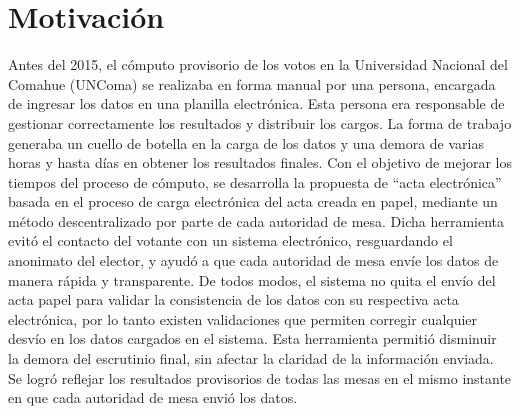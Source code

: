 \section{Motivación}
Antes del 2015, el cómputo provisorio de los votos en la Universidad Nacional del Comahue (UNComa) se realizaba en forma manual por una persona, encargada de ingresar los datos en una planilla electrónica. Esta persona era responsable de gestionar correctamente los resultados y distribuir los cargos. La forma de trabajo generaba un cuello de botella en la carga de los datos y una demora de varias horas y hasta días en obtener los resultados finales. \newline
Con el objetivo de mejorar los tiempos del proceso de cómputo, se desarrolla la propuesta de ``acta electrónica'' basada en el proceso de carga electrónica del acta creada en papel, mediante un método descentralizado  por parte de cada autoridad de mesa. Dicha herramienta evitó el contacto del votante con un sistema electrónico, resguardando el anonimato del elector, y ayudó a que cada autoridad de mesa envíe los datos de manera rápida y transparente. De todos modos, el sistema no quita el envío del acta papel para validar la consistencia de los datos con su respectiva acta electrónica, por lo tanto existen validaciones que permiten corregir cualquier desvío en los datos cargados en el sistema. Esta herramienta permitió disminuir la demora del escrutinio final, sin afectar la claridad de la información enviada. Se logró reflejar los resultados provisorios de todas las mesas 
en el mismo instante en que cada autoridad de mesa envió los datos.

